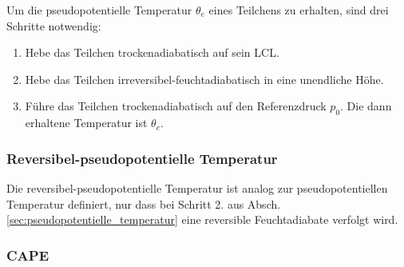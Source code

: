 \documentclass{book}
\begin{document}
Um die pseudopotentielle Temperatur $\theta_e$ eines Teilchens zu erhalten, sind drei Schritte notwendig:
%
\begin{enumerate}
\item Hebe das Teilchen trockenadiabatisch auf sein LCL.
\item Hebe das Teilchen irreversibel-feuchtadiabatisch in eine unendliche Höhe.
\item Führe das Teilchen trockenadiabatisch auf den Referenzdruck $p_0$. Die dann erhaltene Temperatur ist $\theta_e$.
\end{enumerate}
%
\subsubsection{Reversibel-pseudopotentielle Temperatur}
\label{sec:reversibel-pseudopotentielle_temperatur}

Die reversibel-pseudopotentielle Temperatur ist analog zur pseudopotentiellen Temperatur definiert, nur dass bei Schritt 2. aus Absch. \ref{sec:pseudopotentielle_temperatur} eine reversible Feuchtadiabate verfolgt wird.

\subsubsection{CAPE}
\label{sec:cape}
\end{document}
